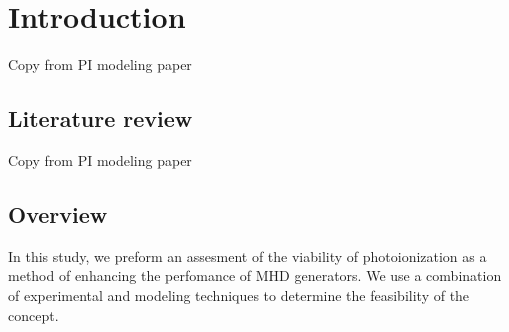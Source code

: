 

\section{Introduction}

Copy from PI modeling paper

\subsection{Literature review}

Copy from PI modeling paper

\subsection{Overview}

In this study, we preform an assesment of the viability of photoionization as a method of enhancing the perfomance of MHD generators. We use a combination of experimental and modeling techniques to determine the feasibility of the concept.



